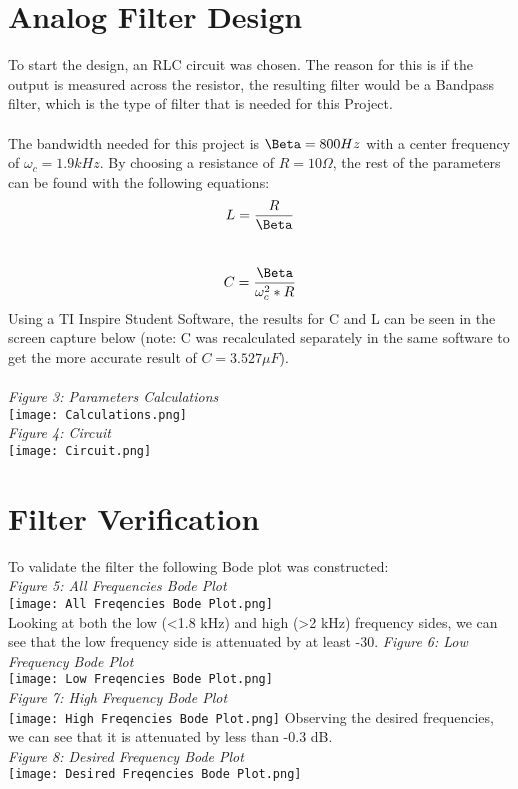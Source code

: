 \documentclass[12pt,a4paper]{article}
\begin{document}
\section{Analog Filter Design}
To start the design, an RLC circuit was chosen. The reason for this is if the output is measured across the resistor, the resulting filter would be a Bandpass filter, which is the type of filter that is needed for this Project.\\
\\
The bandwidth needed for this project is $\Beta = 800  Hz$ with a center frequency of $\omega_c=1.9 kHz$. By choosing a resistance of $R=10 \Omega$, the rest of the parameters can be found with the following equations:\\
$$L=\frac{R}{\Beta}$$\\
$$C=\frac{\Beta}{\omega_c^2 * R}$$
Using a TI Inspire Student Software, the results for C and L can be seen in the screen capture below (note: C was recalculated separately in the same software to get the more accurate result of $C=3.527 \mu F$).\\
\\
\textit{Figure 3: Parameters Calculations}
\\
\texttt{[image: Calculations.png]}
\newpage
\\
\textit{Figure 4: Circuit}
\\
\texttt{[image: Circuit.png]}
\\
\section{Filter Verification}
To validate the filter the following Bode plot was constructed:\\
\newpage
\textit{Figure 5: All Frequencies Bode Plot}
\\
\texttt{[image: All Freqencies Bode Plot.png]}
\\
Looking at both the low (<1.8 kHz) and high (>2 kHz) frequency sides, we can see that the low frequency side is attenuated by at least -30.
\newpage
\textit{Figure 6: Low Frequency Bode Plot}
\\
\texttt{[image: Low Freqencies Bode Plot.png]}
\\
\textit{Figure 7: High Frequency Bode Plot}
\\
\texttt{[image: High Freqencies Bode Plot.png]}
\newpage
Observing the desired frequencies, we can see that it is attenuated by less than -0.3 dB.
\\
\textit{Figure 8: Desired Frequency Bode Plot}
\\
\texttt{[image: Desired Freqencies Bode Plot.png]}
\newpage
\end{document}
